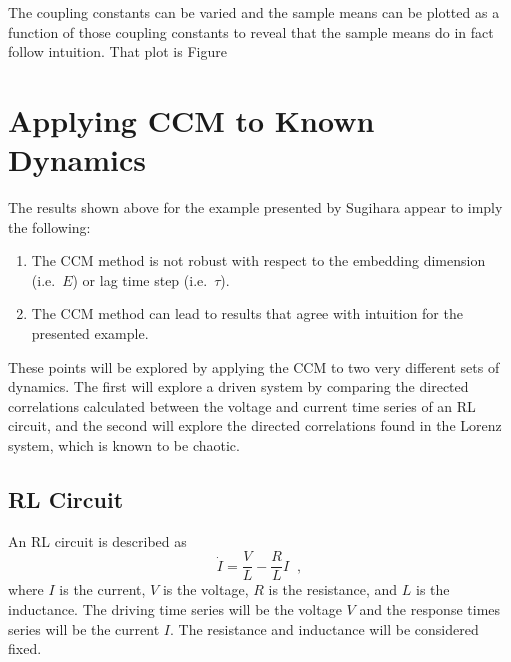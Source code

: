 \documentclass[a4paper,11pt]{article}
\begin{document}
The coupling constants can be varied and the sample means can be plotted as a function of those coupling constants to reveal that the sample means do in fact follow intuition.  That plot is Figure 


\section{Applying CCM to Known Dynamics}
The results shown above for the example presented by Sugihara appear to imply the following:
\begin{enumerate}
\item The CCM method is not robust with respect to the embedding dimension (i.e.\ $E$) or lag time step (i.e.\ $\tau$).
\item The CCM method can lead to results that agree with intuition for the presented example. 
\end{enumerate}
These points will be explored by applying the CCM to two very different sets of dynamics.  The first will explore a driven system by comparing the directed correlations calculated between the voltage and current time series of an RL circuit, and the second will explore the directed correlations found in the Lorenz system, which is known to be chaotic.

\subsection{RL Circuit}
An RL circuit is described as
$$
\dot{I} = \frac{V}{L} - \frac{R}{L} I\;\;,
$$
where $I$ is the current, $V$ is the voltage, $R$ is the resistance, and $L$ is the inductance.  The driving time series will be the voltage $V$ and the response times series will be the current $I$.  The resistance and inductance will be considered fixed.
\end{document}
